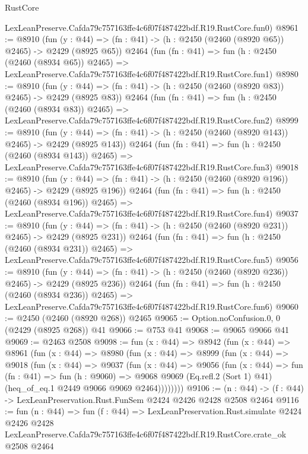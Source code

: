 \begin{lexlean}{RustCore}
\begin{coremodule}
    LexLeanPreserve.Cafda79c757163ffe4c6f07f487422bdf.R19.RustCore.fun0)
@8961 := @8910
    (fun (y : @44) => (fn : @41) -> (h : @2450 (@2460 (@8920 @65)) @2465) -> @2429 (@8925 @65))
    @2464
    (fun (fn : @41) =>
    fun (h : @2450 (@2460 (@8934 @65)) @2465) =>
    LexLeanPreserve.Cafda79c757163ffe4c6f07f487422bdf.R19.RustCore.fun1)
@8980 := @8910
    (fun (y : @44) => (fn : @41) -> (h : @2450 (@2460 (@8920 @83)) @2465) -> @2429 (@8925 @83))
    @2464
    (fun (fn : @41) =>
    fun (h : @2450 (@2460 (@8934 @83)) @2465) =>
    LexLeanPreserve.Cafda79c757163ffe4c6f07f487422bdf.R19.RustCore.fun2)
@8999 := @8910
    (fun (y : @44) => (fn : @41) -> (h : @2450 (@2460 (@8920 @143)) @2465) -> @2429 (@8925 @143))
    @2464
    (fun (fn : @41) =>
    fun (h : @2450 (@2460 (@8934 @143)) @2465) =>
    LexLeanPreserve.Cafda79c757163ffe4c6f07f487422bdf.R19.RustCore.fun3)
@9018 := @8910
    (fun (y : @44) => (fn : @41) -> (h : @2450 (@2460 (@8920 @196)) @2465) -> @2429 (@8925 @196))
    @2464
    (fun (fn : @41) =>
    fun (h : @2450 (@2460 (@8934 @196)) @2465) =>
    LexLeanPreserve.Cafda79c757163ffe4c6f07f487422bdf.R19.RustCore.fun4)
@9037 := @8910
    (fun (y : @44) => (fn : @41) -> (h : @2450 (@2460 (@8920 @231)) @2465) -> @2429 (@8925 @231))
    @2464
    (fun (fn : @41) =>
    fun (h : @2450 (@2460 (@8934 @231)) @2465) =>
    LexLeanPreserve.Cafda79c757163ffe4c6f07f487422bdf.R19.RustCore.fun5)
@9056 := @8910
    (fun (y : @44) => (fn : @41) -> (h : @2450 (@2460 (@8920 @236)) @2465) -> @2429 (@8925 @236))
    @2464
    (fun (fn : @41) =>
    fun (h : @2450 (@2460 (@8934 @236)) @2465) =>
    LexLeanPreserve.Cafda79c757163ffe4c6f07f487422bdf.R19.RustCore.fun6)
@9060 := @2450 (@2460 (@8920 @268)) @2465
@9065 := Option.noConfusion.{0, 0} (@2429 (@8925 @268)) @41
@9066 := @753 @41
@9068 := @9065 @9066 @41
@9069 := @2463 @2508
@9098 := fun (x : @44) =>
  @8942
    (fun (x : @44) =>
    @8961
      (fun (x : @44) =>
      @8980
        (fun (x : @44) =>
        @8999
          (fun (x : @44) =>
          @9018
            (fun (x : @44) =>
            @9037
              (fun (x : @44) =>
              @9056
                (fun (x : @44) =>
                fun (fn : @41) =>
                fun (h : @9060) =>
                @9068
                  @9069
                  (Eq.refl.{2} (Sort 1) @41)
                  (heq_of_eq.{1} @2449 @9066 @9069 @2464))))))))
@9106 := (n : @44) -> (f : @44) -> LexLeanPreservation.Rust.FunSem @2424 @2426 @2428 @2508 @2464
@9116 := fun (n : @44) =>
  fun (f : @44) =>
  LexLeanPreservation.Rust.simulate
    @2424
    @2426
    @2428
    LexLeanPreserve.Cafda79c757163ffe4c6f07f487422bdf.R19.RustCore.crate_ok
    @2508
    @2464
\end{coremodule}
\end{lexlean}
